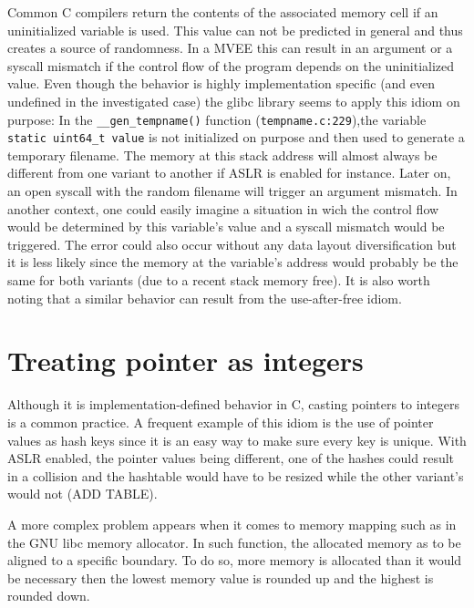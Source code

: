 \documentclass[english]{enstaPRE}
\begin{document}
Common C compilers return the contents of the associated memory cell if an uninitialized variable is used.
This value can not be predicted in general and thus creates a source of randomness. In a MVEE this can result in an argument or a syscall mismatch if the
control flow of the program depends on the uninitialized value.
Even though the behavior is highly implementation specific (and even undefined in the investigated case) the glibc library seems to apply 
this idiom on purpose: In the \texttt{\_\_gen\_tempname()} function (\texttt{tempname.c:229}),the variable \texttt{static uint64\_t value}
is not initialized on purpose and then used to generate a temporary filename.
The memory at this stack address will almost always be different from one variant to another if ASLR is enabled for instance.
Later on, an open syscall with the random filename will trigger an argument mismatch. In another context, one could easily imagine
a situation in wich the control flow would be determined by this variable’s value and a syscall mismatch would be triggered.
The error could also occur without any data layout diversification but it is less likely since the memory at the variable’s address would
probably be the same for both variants (due to a recent stack memory free).
It is also worth noting that a similar behavior can result from the use-after-free idiom.

\section{Treating pointer as integers}

Although it is implementation-defined behavior in C, casting pointers to integers is a common practice.
A frequent example of this idiom is the use of pointer values as hash keys since it is an easy way to make sure every key is unique. With ASLR enabled,
the pointer values being different, one of the hashes could result in a collision and the hashtable would have to be resized while
the other variant’s would not (ADD TABLE).

A more complex problem appears when it comes to memory mapping such as in the GNU libc memory allocator.
In such function, the allocated memory as to be aligned to a specific boundary. To do so, more memory is allocated than it would be 
necessary then the lowest memory value is rounded up and the highest is rounded down.
\end{document}
